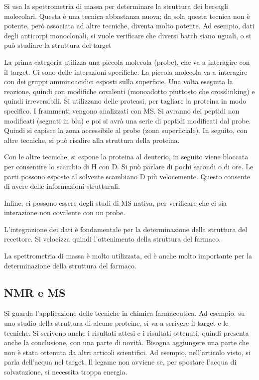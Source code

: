 Si usa la spettrometria di massa per determinare la struttura dei
bersagli molecolari. Questa è una tecnica abbastanza nuova; da sola
questa tecnica non è potente, però associata ad altre tecniche, diventa
molto potente.
Ad esempio, dati degli anticorpi monoclonali, si vuole verificare che
diversi batch siano uguali, o si può studiare la struttura del target

La prima categoria utilizza una piccola molecola (probe), che va a
interagire con il target. Ci sono delle interazioni specifiche.
La piccola molecola va a interagire con dei gruppi amminoacidici esposti
sulla superficie. Una volta eseguita la reazione, quindi con modifiche
covalenti (monoadotto piuttosto che crosslinking) e quindi
irreversibili. Si utilizzano delle proteasi, per tagliare la proteina in
modo specifico. I frammenti vengono analizzati con MS.
Si avranno dei peptidi non modificati (segnati in blu) e poi si avrà una
serie di peptidi modificati dal probe. Quindi si capisce la zona
accessibile al probe (zona superficiale).
In seguito, con altre tecniche, si può risalire alla struttura della
proteina.

Con le altre tecniche, si espone la proteina al deuterio, in seguito
viene bloccata per consentire lo scambio di H con D. Si può parlare di
pochi secondi o di ore.
Le parti possono esposte al solvente scambiano D più velocemente. Questo
consente di avere delle informazioni strutturali.

Infine, ci possono essere degli studi di MS nativa, per verificare che
ci sia interazione non covalente con un probe.

L'integrazione dei dati è fondamentale per la determinazione della
struttura del recettore. Si velocizza quindi l'ottenimento della
struttura del farmaco.

La spettrometria di massa è molto utilizzata, ed è anche molto
importante per la determinazione della struttura del farmaco.

\subsection{NMR e MS}

Si guarda l'applicazione delle tecniche in chimica farmaceutica.
Ad esempio. su uno studio della struttura di alcune proteine, si va a
scrivere il target e le tecniche. Si scrivono anche i risultati attesi e
i risultati ottenuti, quindi presenta anche la conclusione, con una
parte di novità. Bisogna aggiungere una parte che non è stata ottenuta
da altri articoli scientifici.
Ad esempio, nell'articolo visto, si parla dell'acqua nel target. Il
legame non avviene se, per spostare l'acqua di solvatazione, si
necessita troppa energia.

